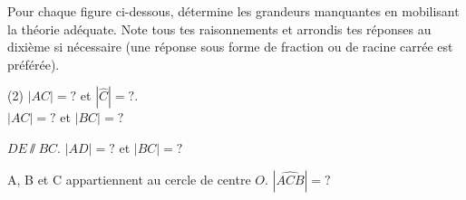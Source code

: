 %
%
    Pour chaque figure ci-dessous, détermine les grandeurs manquantes en mobilisant la théorie adéquate. Note tous tes raisonnements et arrondis tes réponses au dixième si nécessaire (une réponse sous forme de fraction ou de racine carrée est préférée).

    \begin{tasks}[after-item-skip=2cm](2)
        \task
        $|AC| = ?$ et $|\widehat{C}|=?$.\\

        \task
        $|AC|=?$ et $|BC|=?$
        \begin{center}
            
        \end{center}

        \task
        $DE \sslash BC$. $|AD|=?$ et $|BC|=?$
        \begin{center}
            
        \end{center}

        \task
        A, B et C appartiennent au cercle de centre $O$. $|\widehat{ACB}|=?$
        \begin{center}
            
        \end{center}
    \end{tasks}
